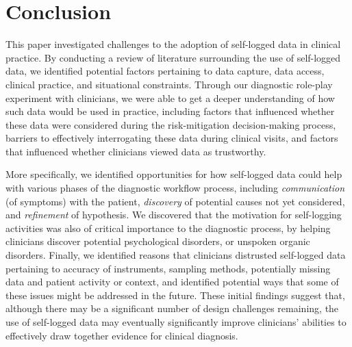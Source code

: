 \documentclass{sigchi}
\begin{document}
\section{Conclusion}






This paper investigated challenges to the adoption of self-logged data in clinical practice. By conducting a review of literature surrounding the use of self-logged data, we identified potential factors pertaining to data capture, data access, clinical practice, and situational constraints.  Through our diagnostic role-play experiment with clinicians, we were able to get a deeper understanding of how such data would be used in practice, including factors that influenced whether these data were considered during the risk-mitigation decision-making process, barriers to effectively interrogating  these data during clinical visits, and factors that influenced whether clinicians viewed data as trustworthy. 

More specifically, we identified opportunities for how self-logged data could help with various phases of the diagnostic workflow process, including \emph{communication} (of symptoms) with the patient,  \emph{discovery} of potential causes not yet considered, and \emph{refinement} of hypothesis.  We discovered that the motivation for self-logging activities was also of critical importance to the diagnostic process, by helping clinicians discover potential psychological disorders, or unspoken organic disorders. Finally, we identified reasons that clinicians distrusted self-logged data pertaining to accuracy of instruments, sampling methods, potentially missing data and patient activity or context, and identified potential ways that some of these issues might be addressed in the future. These initial findings suggest that, although there may be a significant number of design challenges remaining, the use of self-logged data may eventually significantly improve clinicians' abilities to effectively draw together evidence for clinical diagnosis. %
\end{document}

